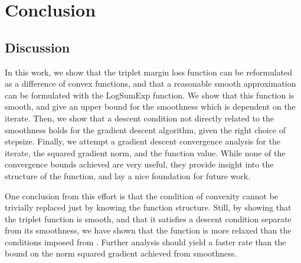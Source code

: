 \documentclass[11pt]{article}
\begin{document}




\section{Conclusion}

\subsection{Discussion}

In this work, we show that the triplet margin loss function can be reformulated as a difference of convex functions, and that a reasonable smooth approximation can be formulated with the LogSumExp function. We show that this function is smooth, and give an upper bound for the smoothness which is dependent on the iterate. Then, we show that a descent condition not directly related to the smoothness holds for the gradient descent algorithm, given the right choice of stepsize. Finally, we attempt a gradient descent convergence analysis for the iterate, the squared gradient norm, and the function value. While none of the convergence bounds achieved are very useful, they provide insight into the structure of the function, and lay a nice foundation for future work.

One conclusion from this effort is that the condition of convexity cannot be trivially replaced just by knowing the function structure. Still, by showing that the triplet function is smooth, and that it satisfies a descent condition separate from its smoothness, we have shown that the function is more relaxed than the conditions imposed from \cite{khamaru_convergence_2018}. Further analysis should yield a faster rate than the bound on the norm squared gradient achieved from smoothness.
\end{document}
